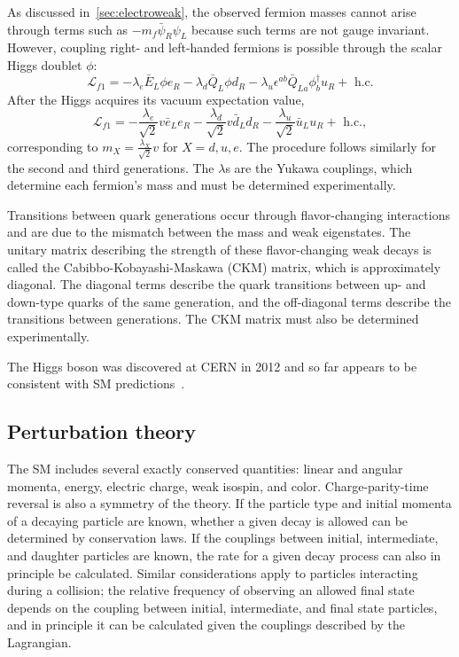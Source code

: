 As discussed in~\cref{sec:electroweak}, the observed fermion masses cannot arise through terms such as $-m_f\bar{\psi}_R\psi_L$ because such terms are not gauge invariant. However, coupling right- and left-handed fermions is possible through the scalar Higgs doublet $\phi$:
\begin{equation}
  \mathcal{L}_{f1} =
  -\lambda_{e}\bar{E}_L\phi e_R
  - \lambda_{d}\bar{Q}_L\phi d_R
  - \lambda_{u} \epsilon^{ab}\bar{Q}_{La}\phi^\dagger_b u_R
  + \text{ h.c.}
\end{equation}
After the Higgs acquires its vacuum expectation value,
\begin{equation}
  \mathcal{L}_{f1} =
  - \frac{\lambda_{e}}{\sqrt{2}}v\bar{e}_Le_R
  - \frac{\lambda_{d}}{\sqrt{2}}v\bar{d}_L d_R
  - \frac{\lambda_{u}}{\sqrt{2}} \bar{u}_{L} u_R
  + \text{ h.c.},
\end{equation}
corresponding to $m_X=\frac{\lambda_X}{\sqrt{2}}v$ for $X=d,u,e$. The procedure
follows similarly for the second and third generations. The $\lambda$s are the
Yukawa couplings, which determine each fermion's mass and must be determined
experimentally.

Transitions between quark generations occur through flavor-changing interactions
and are due to the mismatch between the mass and weak eigenstates. The unitary
matrix describing the strength of these flavor-changing weak decays is called
the Cabibbo-Kobayashi-Maskawa (CKM) matrix, which is approximately diagonal. The
diagonal terms describe the quark transitions between up- and down-type quarks
of the same generation, and the off-diagonal terms describe the transitions
between generations. The CKM matrix must also be determined experimentally.

The Higgs boson was discovered at CERN in 2012 and so far appears to be
consistent with SM predictions~\cite{Collaboration2012}.

\subsection{Perturbation theory}
The SM includes several exactly conserved quantities: linear and angular
momenta, energy, electric charge, weak isospin, and color. Charge-parity-time
reversal is also a symmetry of the theory. If the particle type and initial
momenta of a decaying particle are known, whether a given decay is allowed can
be determined by conservation laws. If the couplings between initial,
intermediate, and daughter particles are known, the rate for a given decay
process can also in principle be calculated. Similar considerations apply to
particles interacting during a collision; the relative frequency of observing an
allowed final state depends on the coupling between initial, intermediate, and
final state particles, and in principle it can be calculated given the couplings
described by the Lagrangian.

